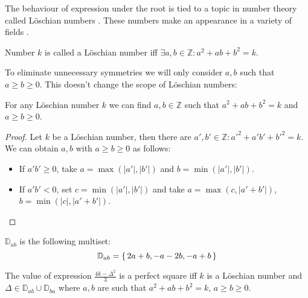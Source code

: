 The behaviour of expression under the root is tied to a topic in number theory called Löschian numbers \cite{marshall1975loschian,oeisA003136}. These numbers make an appearance in a variety of fields \cite{losch1954economics,donovan2016distributive,stannard1995virus}.

\begin{definition}
	\label{v3:def:loeschian}
	Number $k$ is called a Löschian number iff $\exists a,b \in \mathbb Z \colon a^2+ab+b^2=k$.
\end{definition}

To eliminate unnecessary symmetries we will only consider $a,b$ such that $a \geq b \geq 0$. This doesn't change the scope of Löschian numbers:

\begin{lemma}
	\label{v3:lemma:loeschian}
	For any Löschian number $k$ we can find $a,b \in \mathbb Z$ such that $a^2+ab+b^2=k$ and $a \geq b \geq 0$.
\end{lemma}

\begin{proof}
	Let $k$ be a Löschian number, then there are $a',b'\in\mathbb Z\colon a'^2+a'b'+b'^2=k$. We can obtain $a,b$ with $a \geq b \geq 0$ as follows:
	\begin{itemize}
		\item If $a'b' \geq 0$, take $a=\max(|a'|,|b'|)$ and $b=\min(|a'|,|b'|)$.
		\item If $a'b'<0$, set $c = \min(|a'|, |b'|)$ and take $a=\max(c,|a'+b'|)$, $b=\min(|c|, |a'+b'|)$.
	\end{itemize}
\end{proof}

\begin{definition}
    $\mathbb D_{ab}$ is the following multiset:
    \begin{equation}
        \mathbb D_{ab} = \set{2a+b, -a-2b, -a+b}
    \end{equation}
\end{definition}


\begin{lemma}
	\label{v3:lemma:square}
	The value of expression $\frac{4k-\Delta^2}{3}$ is a perfect square iff $k$ is a Löschian number and $\Delta\in \mathbb D_{ab} \cup \mathbb D_{ba}$ where $a,b$ are such that $a^2+ab+b^2=k$, $a \geq b \geq 0$.
\end{lemma}

